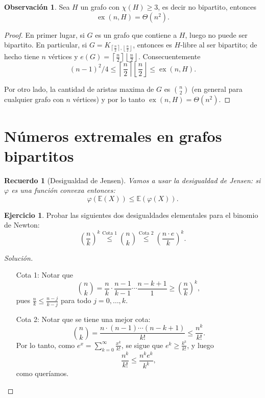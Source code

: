 \documentclass[12pt]{report}
\theoremstyle{plain}
\newtheorem{recuerdo}[theorem]{Recuerdo}
\theoremstyle{definition}
\newtheorem{obs}[theorem]{Observación}
\newtheorem{exercise}[theorem]{Ejercicio}
\newenvironment{solution}{\begin{proof}[Solución]}{\end{proof}}
\newcommand{\ceil}[1]{\left\lceil #1  \right\rceil}
\newcommand{\floor}[1]{\left\lfloor #1  \right\rfloor}
\newcommand{\ex}[2]{\operatorname{ex} (#1, #2)}
\begin{document}
\begin{obs}\label{obs:notar que si H es no bipartito entonces ex(n,H)= Theta (n2)}
Sea $H$ un grafo con $\chi (H) \geq 3$, es decir no bipartito, entonces
\[
    \ex n H = \Theta (n^2).
\]
\end{obs}
\begin{proof}
En primer lugar, si $G$ es un grafo que contiene a $H$, luego no puede ser bipartito. En particular, si $G = K_{\ceil { \frac n 2} , \floor {\frac n 2}}$, entonces es $H$-libre al ser bipartito; de hecho tiene $n$ vértices y $e(G) = \ceil { \frac n 2} \floor {\frac n 2}$. Consecuentemente
\[
    (n-1)^2/4 \leq  \ceil { \frac n 2} \floor {\frac n 2} \leq \ex n H.
\]

Por otro lado, la cantidad de aristas maxima de $G$ es $\binom n 2$ (en general para cualquier grafo con $n$ vértices) y por lo tanto $\ex n H = \Theta (n^2)$.
\end{proof}




\section{Números extremales en grafos bipartitos}


\begin{recuerdo}[Desigualdad de Jensen]
Vamos a usar la desigualdad de Jensen: si $\varphi$ es una función convexa entonces:
\[
    \boxed{\varphi(\mathbb E (X)) \leq \mathbb E (\varphi (X)).}
\]
\end{recuerdo}


\begin{exercise}
Probar las siguientes dos desigualdades elementales para el binomio de Newton:
\[
    \left(\frac n k \right)^k \overset{\text{Cota 1}}{\leq} \binom n k \overset{\text{Cota 2}}{\leq} \left(\frac{n \cdot e}{k}\right)^k.
\]
\end{exercise}
\begin{solution}
\begin{enumerate}
\item[]
\item[Cota 1:] Notar que
\[
    \binom n k = \frac{n}{k} \cdot \frac{n-1}{k-1} \cdots \frac{n-k+1}{1}\geq \left ( \frac n k \right )^k,
\]
pues $\frac n k \leq \frac{n - j}{k - j}$ para todo $j = 0 , \ldots, k$.
\item[Cota 2:] Notar que se tiene una mejor cota:
\[
    \binom n k = \frac{n \cdot (n-1) \cdots (n-k + 1)}{k!} \leq \frac{n^k}{k!}.
\]
Por lo tanto, como $e^x = \sum_{k = 0}^\infty \frac{x^k}{k!}$, se sigue que $e^k \geq \frac{k^k}{k!}$, y luego
\[
    \frac{n^k}{k!} \leq \frac{n^ke^k}{k^k},
\]
como queríamos.
\end{enumerate}
\end{solution}
\end{document}
